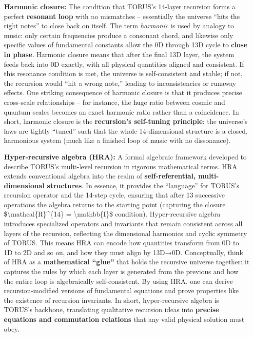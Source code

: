 \documentclass[]{article}
\begin{document}
{\textbf{Harmonic closure:} The condition that TORUS's 14-layer recursion
forms a perfect \textbf{resonant loop} with no mismatches -- essentially
the universe ``hits the right notes'' to close back on itself. The term
\emph{harmonic} is used by analogy to music: only certain frequencies
produce a consonant chord, and likewise only specific values of
fundamental constants allow the 0D through 13D cycle to \textbf{close in
phase}​. Harmonic closure means that after the final 13D layer, the
system feeds back into 0D exactly, with all physical quantities aligned
and consistent​. If this resonance condition is met, the universe is
self-consistent and stable; if not, the recursion would ``hit a wrong
note,'' leading to inconsistencies or runaway effects. One striking
consequence of harmonic closure is that it produces precise cross-scale
relationships -- for instance, the huge ratio between cosmic and quantum
scales becomes an exact harmonic ratio rather than a coincidence​. In
short, harmonic closure is the \textbf{recursion's self-tuning
principle}: the universe's laws are tightly ``tuned'' such that the
whole 14-dimensional structure is a closed, harmonious system (much like
a finished loop of music with no dissonance).

\textbf{Hyper-recursive algebra (HRA):} A formal algebraic framework
developed to describe TORUS's multi-level recursion in rigorous
mathematical terms. HRA extends conventional algebra into the realm of
\textbf{self-referential, multi-dimensional structures}​. In essence, it
provides the ``language'' for TORUS's recursion operator and the 14-step
cycle, ensuring that after 13 successive operations the algebra returns
to the starting point (capturing the closure
\$\textbackslash{}mathcal\{R\}\^{}\{14\} = \textbackslash{}mathbb\{I\}\$
condition)​. Hyper-recursive algebra introduces specialized operators
and invariants that remain consistent across all layers of the
recursion, reflecting the dimensional harmonics and cyclic symmetry of
TORUS​. This means HRA can encode how quantities transform from 0D to 1D
to 2D and so on, and how they must align by 13D→0D. Conceptually, think
of HRA as a \textbf{mathematical ``glue''} that holds the recursive
universe together: it captures the rules by which each layer is
generated from the previous and how the entire loop is algebraically
self-consistent. By using HRA, one can derive recursion-modified
versions of fundamental equations and prove properties like the
existence of recursion invariants. In short, hyper-recursive algebra is
TORUS's backbone, translating qualitative recursion ideas into
\textbf{precise equations and commutation relations} that any valid
physical solution must obey.

}
\end{document}
